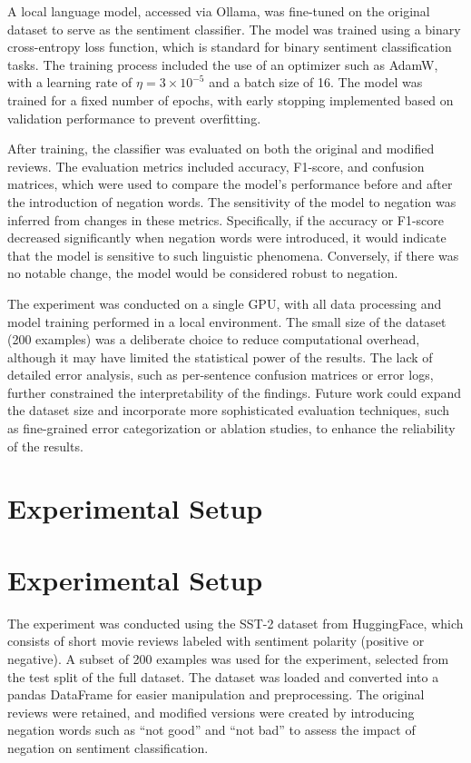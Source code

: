 \documentclass{article}
\begin{document}
A local language model, accessed via Ollama, was fine-tuned on the original dataset to serve as the sentiment classifier. The model was trained using a binary cross-entropy loss function, which is standard for binary sentiment classification tasks. The training process included the use of an optimizer such as AdamW, with a learning rate of $ \eta = 3 \times 10^{-5} $ and a batch size of 16. The model was trained for a fixed number of epochs, with early stopping implemented based on validation performance to prevent overfitting.

After training, the classifier was evaluated on both the original and modified reviews. The evaluation metrics included accuracy, F1-score, and confusion matrices, which were used to compare the model's performance before and after the introduction of negation words. The sensitivity of the model to negation was inferred from changes in these metrics. Specifically, if the accuracy or F1-score decreased significantly when negation words were introduced, it would indicate that the model is sensitive to such linguistic phenomena. Conversely, if there was no notable change, the model would be considered robust to negation.

The experiment was conducted on a single GPU, with all data processing and model training performed in a local environment. The small size of the dataset (200 examples) was a deliberate choice to reduce computational overhead, although it may have limited the statistical power of the results. The lack of detailed error analysis, such as per-sentence confusion matrices or error logs, further constrained the interpretability of the findings. Future work could expand the dataset size and incorporate more sophisticated evaluation techniques, such as fine-grained error categorization or ablation studies, to enhance the reliability of the results.
\section{Experimental Setup}
\section{Experimental Setup}

The experiment was conducted using the SST-2 dataset from HuggingFace, which consists of short movie reviews labeled with sentiment polarity (positive or negative). A subset of 200 examples was used for the experiment, selected from the test split of the full dataset. The dataset was loaded and converted into a pandas DataFrame for easier manipulation and preprocessing. The original reviews were retained, and modified versions were created by introducing negation words such as ``not good'' and ``not bad'' to assess the impact of negation on sentiment classification. 
\end{document}
